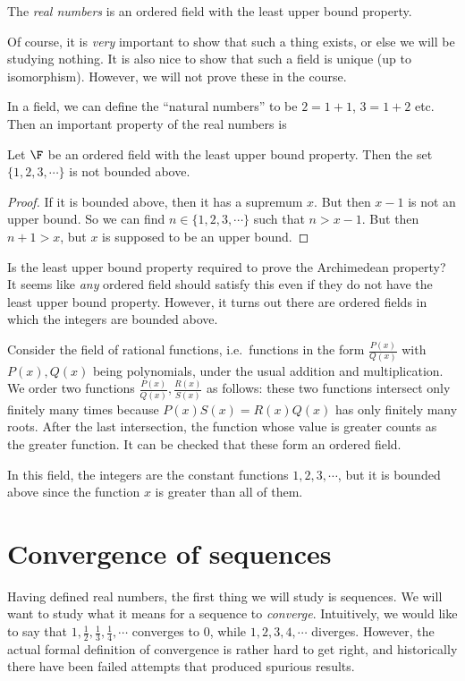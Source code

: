 \documentclass[a4paper]{article}
\begin{document}
\begin{defi}
  The \emph{real numbers} is an ordered field with the least upper bound property.
\end{defi}
Of course, it is \emph{very} important to show that such a thing exists, or else we will be studying nothing. It is also nice to show that such a field is unique (up to isomorphism). However, we will not prove these in the course.

In a field, we can define the ``natural numbers'' to be $2 = 1 + 1$, $3 = 1 + 2$ etc. Then an important property of the real numbers is
\begin{lemma}
  Let $\F$ be an ordered field with the least upper bound property. Then the set $\{1, 2, 3, \cdots\}$ is not bounded above.
\end{lemma}

\begin{proof}
  If it is bounded above, then it has a supremum $x$. But then $x - 1$ is not an upper bound. So we can find $n\in \{1, 2, 3, \cdots\}$ such that $n> x - 1$. But then $n + 1 > x$, but $x$ is supposed to be an upper bound.
\end{proof}

Is the least upper bound property required to prove the Archimedean property? It seems like \emph{any} ordered field should satisfy this even if they do not have the least upper bound property. However, it turns out there are ordered fields in which the integers are bounded above.

Consider the field of rational functions, i.e.\ functions in the form $\frac{P(x)}{Q(x)}$ with $P(x), Q(x)$ being polynomials, under the usual addition and multiplication. We order two functions $\frac{P(x)}{Q(x)}, \frac{R(x)}{S(x)}$ as follows: these two functions intersect only finitely many times because $P(x)S(x) = R(x)Q(x)$ has only finitely many roots. After the last intersection, the function whose value is greater counts as the greater function. It can be checked that these form an ordered field.

In this field, the integers are the constant functions $1, 2, 3, \cdots$, but it is bounded above since the function $x$ is greater than all of them.

\section{Convergence of sequences}
Having defined real numbers, the first thing we will study is sequences. We will want to study what it means for a sequence to \emph{converge}. Intuitively, we would like to say that $1, \frac{1}{2}, \frac{1}{3}, \frac{1}{4},\cdots$ converges to $0$, while $1, 2, 3, 4, \cdots$ diverges. However, the actual formal definition of convergence is rather hard to get right, and historically there have been failed attempts that produced spurious results.
\end{document}
